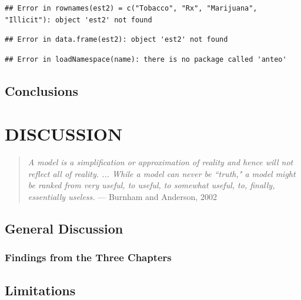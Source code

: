 \documentclass[]{DissertateUSU}
\begin{document}
\begin{verbatim}
## Error in rownames(est2) = c("Tobacco", "Rx", "Marijuana", "Illicit"): object 'est2' not found
\end{verbatim}

\begin{verbatim}
## Error in data.frame(est2): object 'est2' not found
\end{verbatim}

\begin{verbatim}
## Error in loadNamespace(name): there is no package called 'anteo'
\end{verbatim}

\section{Conclusions}\label{conclusions}

\singlespacing

\FloatBarrier

\newpage

 \fancyhead[R]{\thepage} \fancyfoot[C]{}

\chapter{DISCUSSION}

\begin{quote}
\emph{A model is a simplification or approximation of reality and hence will not reflect all of reality. ... While a model can never be ``truth," a model might be ranked from very useful, to useful, to somewhat useful, to, finally, essentially useless.}
--- Burnham and Anderson, 2002
\end{quote}

\doublespacing

\section{General Discussion}\label{general-discussion}

\subsection{Findings from the Three
Chapters}\label{findings-from-the-three-chapters}

\section{Limitations}\label{limitations}
\end{document}
